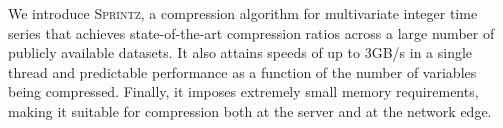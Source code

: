 \documentclass[acmlarge]{acmart}
\newcommand{\mine}{\textsc{Sprintz}}
\newcommand{\minesp}{\textsc{Sprintz}\text{ }}
\newcommand{\fire}{\textsc{Fire}\text{ }}
\begin{document}
We introduce \mine, a compression algorithm for multivariate integer time series that achieves state-of-the-art compression ratios across a large number of publicly available datasets. It also attains speeds of up to 3GB/s in a single thread and predictable performance as a function of the number of variables being compressed. Finally, it imposes extremely small memory requirements, making it suitable for compression both at the server and at the network edge. %




% 




% 



\balance
\end{document}
